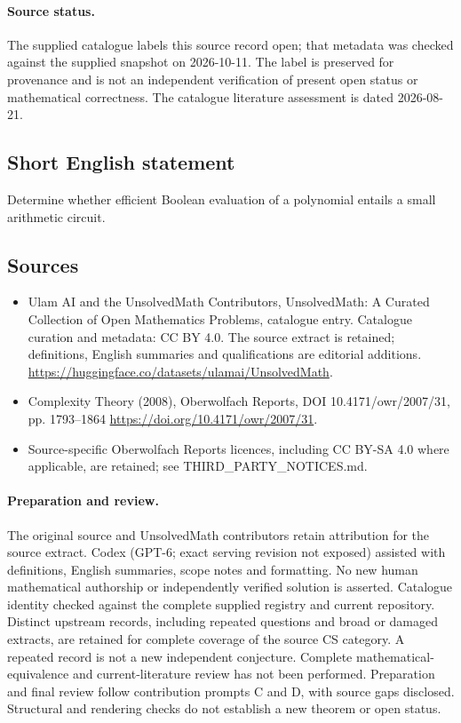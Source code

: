\documentclass[11pt]{article}
\begin{document}
\paragraph{Source status.}
The supplied catalogue labels this source record open; that metadata was checked against the supplied snapshot on 2026-10-11. The label is preserved for provenance and is not an independent verification of present open status or mathematical correctness. The catalogue literature assessment is dated 2026-08-21.
\subsection{Short English statement}
Determine whether efficient Boolean evaluation of a polynomial entails a small arithmetic circuit.
\subsection{Sources}
\begin{itemize}
\item[\hypertarget{source:statement:1}{S1}] Ulam AI and the UnsolvedMath Contributors, UnsolvedMath: A Curated Collection of Open Mathematics Problems, catalogue entry. Catalogue curation and metadata: CC BY 4.0. The source extract is retained; definitions, English summaries and qualifications are editorial additions.
\url{https://huggingface.co/datasets/ulamai/UnsolvedMath}.
\item[\hypertarget{source:statement:2}{S2}] Complexity Theory (2008), Oberwolfach Reports, DOI 10.4171/owr/2007/31, pp. 1793--1864
\url{https://doi.org/10.4171/owr/2007/31}.
\item Source-specific Oberwolfach Reports licences, including CC BY-SA 4.0 where applicable, are retained; see THIRD\_PARTY\_NOTICES.md.
\end{itemize}
\paragraph{Preparation and review.}
The original source and UnsolvedMath contributors retain attribution for the source extract. Codex (GPT-6; exact serving revision not exposed) assisted with definitions, English summaries, scope notes and formatting. No new human mathematical authorship or independently verified solution is asserted. Catalogue identity checked against the complete supplied registry and current repository. Distinct upstream records, including repeated questions and broad or damaged extracts, are retained for complete coverage of the source CS category. A repeated record is not a new independent conjecture. Complete mathematical-equivalence and current-literature review has not been performed. Preparation and final review follow contribution prompts C and D, with source gaps disclosed. Structural and rendering checks do not establish a new theorem or open status.
\label{end:statement}
\end{document}
